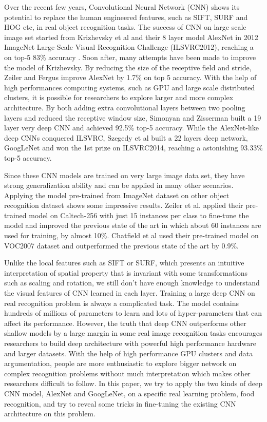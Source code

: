 ﻿Over the recent few years, Convolutional Neural Network (CNN) shows its potential to replace the human engineered features, such as SIFT\cite{lowe1999object}, SURF\cite{bay2006surf} and HOG\cite{dalal2005histograms} etc, in real object recognition tasks.  The success of CNN on large scale image set started from Krizhevsky et al\cite{krizhevsky2012imagenet} and their 8 layer model AlexNet in 2012 ImageNet Large-Scale Visual Recognition Challenge (ILSVRC2012), reaching a on top-5 83\% accuracy . Soon after, many attempts have been made to improve the model of Krizhevsky.
By reducing the size of the receptive field and stride, Zeiler and Fergus improve AlexNet by 1.7\% on top 5 accuracy\cite{zeiler2014visualizing}. With the help of high performances computing systems, such as GPU and large scale distributed clusters, it is possible for researchers to explore larger and more complex architecture. By both adding extra convolutional layers between two pooling layers and reduced the receptive window size, Simonyan and Zisserman built a 19 layer very deep CNN and achieved 92.5\% top-5 accuracy\cite{simonyan2014very}. While the AlexNet-like deep CNNs conquered ILSVRC, Szegedy et al built a 22 layers deep network, GoogLeNet \cite{szegedy2014going} and won the 1st prize on ILSVRC2014, reaching a astonishing 93.33\% top-5 accuracy.

Since these CNN models are trained on very large image data set, they have strong generalization ability and can be applied in many other scenarios. Applying the model pre-trained from ImageNet dataset on other object recognition dataset shows some impressive results.
Zeiler et al. applied their pre-trained model on Caltech-256 with just 15 instances per class to fine-tune the model and improved the previous state of the art in which about 60 instances are used for training, by almost 10\%\cite{zeiler2014visualizing}.
Chatfield et al used their pre-trained model on VOC2007 dataset and outperformed the previous state of the art by 0.9\%\cite{Chatfield14}.

Unlike the local features such as SIFT or SURF, which presents an intuitive interpretation of spatial property that is invariant with some transformations such as scaling and rotation, we still don't have enough knowledge to understand the visual features of CNN learned in each layer. Training a large deep CNN on real recognition problem is always a complicated task. The model contains hundreds of millions of parameters to learn and lots of hyper-parameters that can affect its performance. However, the truth that deep CNN outperforms other shallow models by a large margin in some real image recognition tasks encourages researchers to build deep architecture with powerful high performance hardware and larger datasets. With the help of high performance GPU clusters and data argumentation, people are more enthusiastic to explore bigger network on complex recognition problems without much interpretation which makes other researchers difficult to follow. In this paper, we try to apply the two kinds of deep CNN model, AlexNet and GoogLeNet, on a specific real learning problem, food recognition, and try to reveal some tricks in fine-tuning the existing CNN architecture on this problem.
